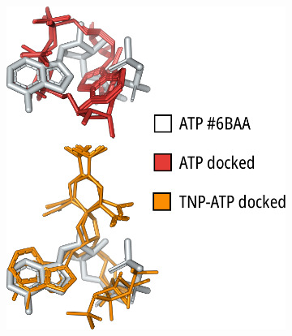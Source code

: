 \begin{figure}[hbtp]
	\centering
	\begin{subfigure}[t]{0.30\textwidth}
		\caption{}\label{ch3fig:6baa_docking}
		\centering
		\includegraphics[width=\textwidth]{6baa_docking.pdf}
	\end{subfigure}
	\hfill
	\begin{subfigure}[t]{0.28\textwidth}
		\caption{}\label{ch3fig:6c3p_docking}
		\centering

\end{subfigure}
\end{figure}
